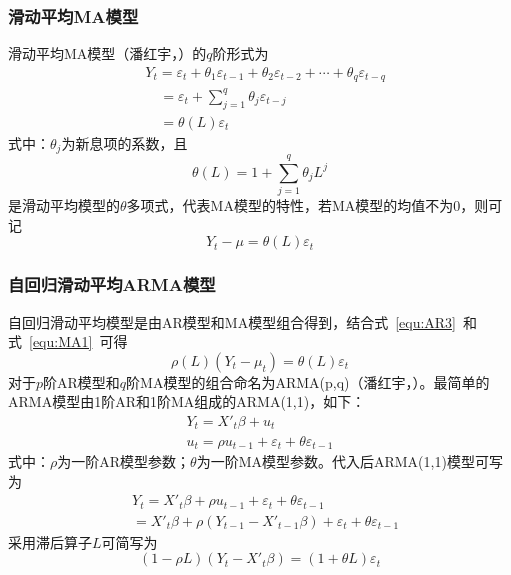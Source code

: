 \subsubsection{滑动平均MA模型}

滑动平均MA模型（潘红宇，\citeyear{cryer2011时间序列分析及应用}）的$q$阶形式为
\begin{align}
  \label{equ:mama}
  & {{Y}_{t}}={{\varepsilon }_{t}}+{{\theta }_{1}}{{\varepsilon }_{t-1}}+{{\theta }_{2}}{{\varepsilon }_{t-2}}+\cdots +{{\theta }_{q}}{{\varepsilon }_{t-q}} \nonumber \\ 
 & \quad ={{\varepsilon }_{t}}+\sum\limits_{j=1}^{q}{{{\theta }_{j}}{{\varepsilon }_{t-j}}} \\ 
 & \quad =\theta (L){{\varepsilon }_{t}} \nonumber
\end{align}
式中：${\theta }_{j}$为新息项的系数，且
\begin{equation}
	\theta (L)=1+\sum\limits_{j=1}^{q}{{{\theta }_{j}}{{L}^{j}}}
\end{equation}
是滑动平均模型的${\theta }$多项式，代表MA模型的特性，若MA模型的均值不为0，则可记
\begin{equation}
	\label{equ:MA1}
	{{Y}_{t}}-\mu =\theta (L){{\varepsilon }_{t}}
\end{equation}

\subsubsection{自回归滑动平均ARMA模型}

自回归滑动平均模型是由AR模型和MA模型组合得到，结合式~\ref{equ:AR3}~和式~\ref{equ:MA1}~可得
\begin{equation}
	\rho (L)({{Y}_{t}}-{{\mu }_{t}})=\theta (L){{\varepsilon }_{t}}
\end{equation}
对于$p$阶AR模型和$q$阶MA模型的组合命名为ARMA(p,q)（潘红宇，\citeyear{cryer2011时间序列分析及应用}）。最简单的ARMA模型由1阶AR和1阶MA组成的ARMA(1,1)，如下：
\begin{gather}
 	{{Y}_{t}}={{{{X}'}}_{t}}\beta +{{u}_{t}} \\ 
	{{u}_{t}}=\rho {{u}_{t-1}}+{{\varepsilon }_{t}}+\theta {{\varepsilon }_{t-1}}
\end{gather}
式中：$\rho$为一阶AR模型参数；$\theta$为一阶MA模型参数。代入后ARMA(1,1)模型可写为
\begin{align}
  & {{Y}_{t}}={{{{X}'}}_{t}}\beta +\rho {{u}_{t-1}}+{{\varepsilon }_{t}}+\theta {{\varepsilon }_{t-1}} \\ 
 & ={{{{X}'}}_{t}}\beta +\rho ({{Y}_{t-1}}-{{{{X}'}}_{t-1}}\beta )+{{\varepsilon }_{t}}+\theta {{\varepsilon }_{t-1}}
\end{align}
采用滞后算子$L$可简写为
\begin{equation}
	(1-\rho L)({{Y}_{t}}-{{{X}'}_{t}}\beta )=(1+\theta L){{\varepsilon }_{t}}
\end{equation}

